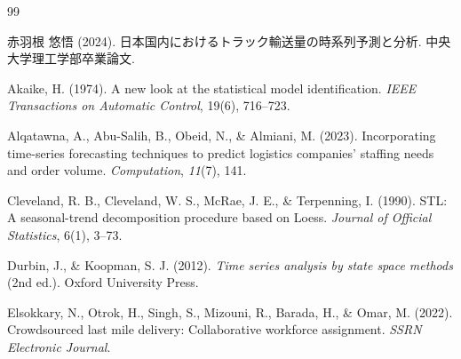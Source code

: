 \documentclass{bcsj}
\begin{document}

\begin{thebibliography}{99}
  \setlength{\itemsep}{0pt}


赤羽根 悠悟 (2024). 日本国内におけるトラック輸送量の時系列予測と分析. 中央大学理工学部卒業論文.

Akaike, H. (1974). A new look at the statistical model identification. 
\textit{IEEE Transactions on Automatic Control}, 19(6), 716--723.


Alqatawna, A., Abu-Salih, B., Obeid, N., \& Almiani, M. (2023). 
Incorporating time-series forecasting techniques to predict logistics companies' staffing needs and order volume. 
\textit{Computation}, \textit{11}(7), 141.


Cleveland, R. B., Cleveland, W. S., McRae, J. E., \& Terpenning, I. (1990).
STL: A seasonal-trend decomposition procedure based on Loess. 
\textit{Journal of Official Statistics}, 6(1), 3--73.

Durbin, J., \& Koopman, S. J. (2012). 
\textit{Time series analysis by state space methods} (2nd ed.). Oxford University Press.

Elsokkary, N., Otrok, H., Singh, S., Mizouni, R., Barada, H., \& Omar, M. (2022).
Crowdsourced last mile delivery: Collaborative workforce assignment. 
\textit{SSRN Electronic Journal}.



\end{thebibliography}
\end{document}
